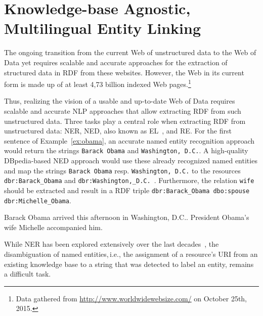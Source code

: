 
\chapter{Knowledge-base Agnostic, Multilingual Entity Linking}

The ongoing transition from the current Web of unstructured data to the Web of Data yet requires scalable and accurate approaches for the extraction of structured data in \ac{RDF} from these websites.
However, the Web in its current form is made up of at least 4,73  billion indexed Web pages.\footnote{Data gathered from \url{http://www.worldwidewebsize.com/} on October 25th, 2015.}


Thus, realizing the vision of a usable and up-to-date Web of Data requires scalable and accurate \ac{NLP} approaches that allow extracting \ac{RDF} from such unstructured data.
Three tasks play a central role when extracting \ac{RDF} from unstructured data:  \ac{NER}, \ac{NED}, also known as \ac{EL}~\cite{Mihalcea:2007:WLD:1321440.1321475}, and \ac{RE}.
For the first sentence of Example~\ref{ex:obama}, an accurate named entity recognition approach would return the strings \texttt{Barack Obama} and \texttt{Washington, D.C.}.
A high-quality DBpedia-based \ac{NED} approach would use these already recognized named entities and map the strings \texttt{Barack Obama} resp. \texttt{Washington, D.C.} to the resources \texttt{dbr:Barack\_Obama} and \texttt{dbr:Washington,\_D.C.}~\cite{dbpedia-swj}. 
Furthermore, the relation \texttt{wife} should be extracted and result in a RDF triple \texttt{dbr:Barack\_Obama dbo:spouse dbr:Michelle\_Obama}.
\begin{ex}
Barack Obama arrived this afternoon in Washington, D.C.. President Obama's wife Michelle accompanied him.
\label{ex:obama}
\end{ex}
While \ac{NER} has been explored extensively over the last decades~\cite{StanfordNER}, the disambiguation of named entities,\,i.e., the assignment of a resource's URI from an existing knowledge base to a string that was detected to label an entity, remains a difficult task.

